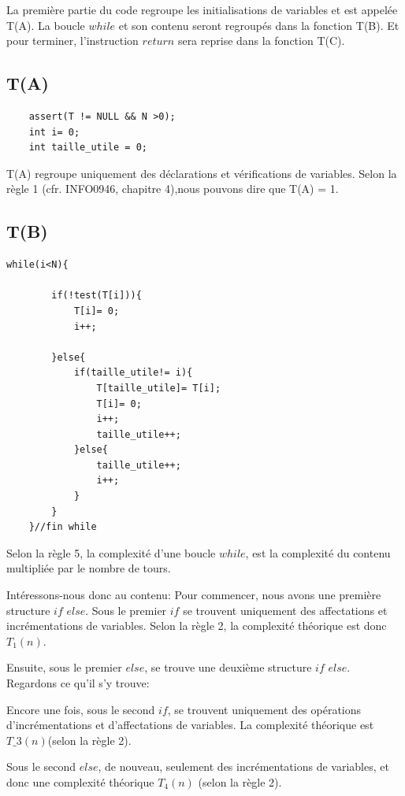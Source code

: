 \documentclass[a4paper, 11pt, oneside]{article}
\begin{document}
La première partie du code regroupe les initialisations de variables et est appelée T(A). La boucle $while$ et son contenu seront regroupés dans la fonction T(B). Et pour terminer, l'instruction $return$ sera reprise dans la fonction T(C).

\subsection{T(A)}

\begin{lstlisting}
    assert(T != NULL && N >0);
    int i= 0;
    int taille_utile = 0;
\end{lstlisting}

T(A) regroupe uniquement des déclarations et vérifications de variables. Selon la règle 1 (cfr. INFO0946, chapitre 4),nous pouvons dire que T(A) = 1.


\subsection{T(B)}

\begin{lstlisting}
while(i<N){
          
        if(!test(T[i])){
            T[i]= 0;
            i++;
            
        }else{
            if(taille_utile!= i){
                T[taille_utile]= T[i];
                T[i]= 0;
                i++;
                taille_utile++;
            }else{
                taille_utile++;
                i++;
            }
        }
    }//fin while
\end{lstlisting}
Selon la règle 5, la complexité d'une boucle $while$, est la complexité du contenu multipliée par le nombre de tours.

Intéressons-nous donc au contenu: 
Pour commencer, nous avons une première structure $if$ $else$. Sous le premier $if$ se trouvent uniquement des affectations et incrémentations de variables. Selon la règle 2, la complexité théorique est donc $T_1(n)$. 


Ensuite, sous le premier $else$, se trouve une deuxième structure $if$ $else$. Regardons ce qu'il s'y trouve:

Encore une fois, sous le second $if$, se trouvent uniquement des opérations d'incrémentations et d'affectations de variables. La complexité théorique est $T\_3(n)$(selon la règle 2). 

Sous le second $else$, de nouveau, seulement des incrémentations de variables, et donc une complexité théorique $T_4(n)$ (selon la règle 2). 
\end{document}

